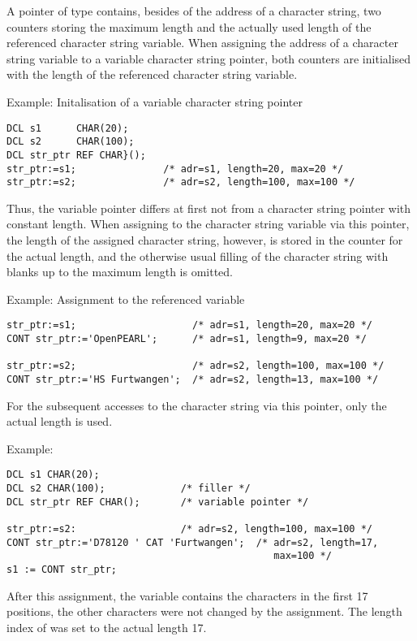 A pointer of type  contains, besides of the address of a
character string, two counters storing the maximum length and the
actually used length of the referenced character string variable. When
assigning the address of a character string variable to a variable
character string pointer, both counters are initialised with the length
of the referenced character string variable.

Example: Initalisation of a variable character string pointer

\begin{lstlisting}
DCL s1      CHAR(20);
DCL s2      CHAR(100);
DCL str_ptr REF CHAR}();
str_ptr:=s1;               /* adr=s1, length=20, max=20 */ 
str_ptr:=s2;               /* adr=s2, length=100, max=100 */
\end{lstlisting}

Thus, the variable pointer differs at first not from a character string
pointer with constant length. When assigning to the character string
variable via this pointer, the length of the assigned character string,
however, is stored in the counter for the actual length, and the
otherwise usual filling of the character string with blanks up to the
maximum length is omitted.

Example: Assignment to the referenced variable

\begin{lstlisting}
str_ptr:=s1;                    /* adr=s1, length=20, max=20 */ 
CONT str_ptr:='OpenPEARL';      /* adr=s1, length=9, max=20 */ 
 
str_ptr:=s2;                    /* adr=s2, length=100, max=100 */
CONT str_ptr:='HS Furtwangen';  /* adr=s2, length=13, max=100 */
\end{lstlisting}

For the subsequent accesses to the character string via this pointer,
only the actual length is used.

Example:

\begin{lstlisting}
DCL s1 CHAR(20);
DCL s2 CHAR(100);             /* filler */ 
DCL str_ptr REF CHAR();       /* variable pointer */ 

str_ptr:=s2:                  /* adr=s2, length=100, max=100 */ 
CONT str_ptr:='D78120 ' CAT 'Furtwangen';  /* adr=s2, length=17,
                                              max=100 */
s1 := CONT str_ptr;
\end{lstlisting}

After this assignment, the variable  contains the characters
 in the first 17 positions, the other characters
were not changed by the assignment. The length index of  was
set to the actual length 17.


